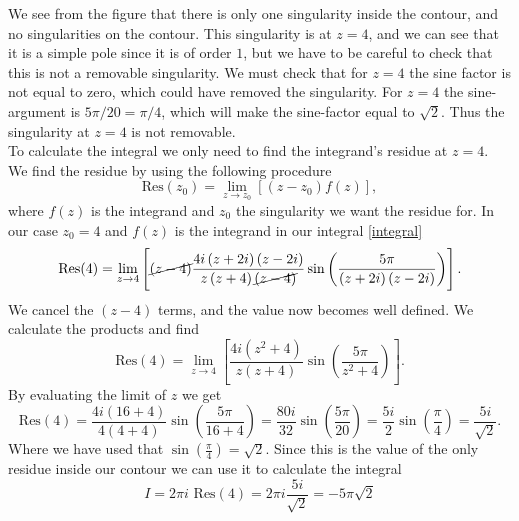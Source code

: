 \documentclass[12pt,twoside]{article}
\begin{document}
We see from the figure that there is only one singularity inside the contour, and no singularities on the contour. This singularity is at $z=4$, and we can see that it is a simple pole since it is of order $1$, but we have to be careful to check that this is not a removable singularity. We must check that for $z=4$ the sine factor is not equal to zero, which could have removed the singularity. For $z=4$ the sine-argument is $5\pi/20=\pi/4$, which will make the sine-factor equal to $\sqrt{2}$. Thus the singularity at $z=4$ is not removable.\\
To calculate the integral we only need to find the integrand's residue at $z=4$. We find the residue by using the following procedure
\begin{equation}
  \text{Res}(z_0) = \lim_{z \to z_0} \left[(z-z_0)f(z)\right],
\end{equation}
where $f(z)$ is the integrand and $z_0$ the singularity we want the residue for. In our case $z_0=4$ and $f(z)$ is the integrand in our integral \eqref{integral}
\begin{equation}
    \text{Res}(4) = \lim_{z \to 4}\left[\cancel{(z-4)}\frac{4i\left(z+2i\right)\left(z-2i\right)}{z\left(z+4\right)\cancel{\left(z-4\right)}}\sin{\left( \frac{5\pi}{\left(z+2i\right)\left(z-2i\right)} \right)}\right].
\end{equation}
We cancel the $(z-4)$ terms, and the value now becomes well defined. We calculate the products and find
\begin{equation}
    \text{Res}(4) = \lim_{z \to 4}\left[\frac{4i\left(z^2+4\right)}{z\left(z+4\right)}\sin{\left( \frac{5\pi}{z^2+4} \right)}\right].
\end{equation}
By evaluating the limit of $z$ we get
\begin{equation}
    \text{Res}(4) = \frac{4i\left(16+4\right)}{4\left(4+4\right)}\sin{\left( \frac{5\pi}{16+4} \right)} = \frac{80i}{32}\sin{\left( \frac{5\pi}{20} \right)} = \frac{5i}{2}\sin{\left(\frac{\pi}{4}\right)} = \frac{5i}{\sqrt{2}}.
\end{equation}
Where we have used that $\sin{\left(\frac{\pi}{4}\right)}=\sqrt{2}$. Since this is the value of the only residue inside our contour we can use it to calculate the integral
\begin{equation}
  I  = 2\pi i\,\,\text{Res}(4) = 2\pi i\frac{5i}{\sqrt{2}} = -5\pi\sqrt{2}
\end{equation}
\newpage
\end{document}
